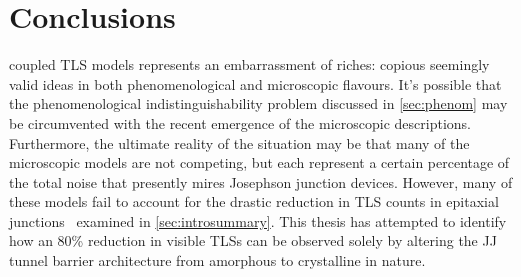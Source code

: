 \chapter{Conclusions}\label{ch:conclusions}

 coupled TLS models represents an embarrassment of riches: copious seemingly valid ideas in both phenomenological and microscopic flavours.
It's possible that the phenomenological indistinguishability problem discussed in \cref{sec:phenom} may be circumvented with the recent emergence of the microscopic descriptions.
Furthermore, the ultimate reality of the situation may be that many of the microscopic models are not competing, but each represent a certain percentage of the total noise that presently mires Josephson junction devices.
However, many of these models fail to account for the drastic reduction in TLS counts in epitaxial junctions~\cite{Oh2006} examined in \cref{sec:introsummary}.
This thesis has attempted to identify how an 80\% reduction in visible TLSs can be observed solely by altering the JJ tunnel barrier architecture from amorphous to crystalline in nature.

